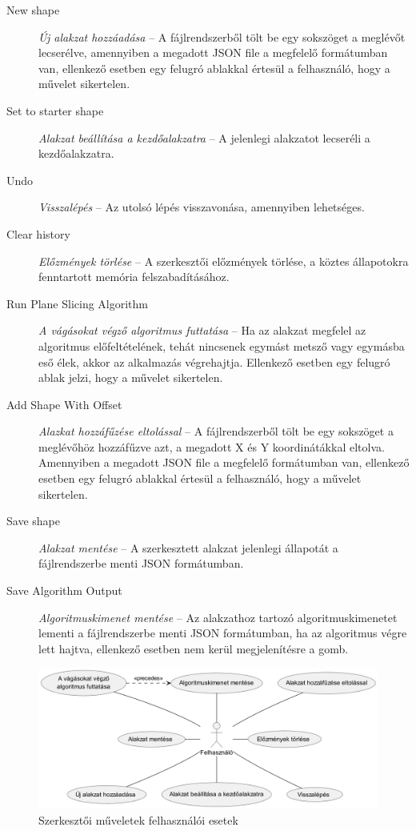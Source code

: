 \begin{description}
    \item[New shape] \textit{Új alakzat hozzáadása} -- A fájlrendszerből tölt be egy sokszöget a meglévőt lecserélve, amennyiben a megadott JSON file a megfelelő formátumban van, ellenkező esetben egy felugró ablakkal értesül a felhasználó, hogy a művelet sikertelen.
    \item[Set to starter shape] \textit{Alakzat beállítása a kezdőalakzatra} -- A jelenlegi alakzatot lecseréli a kezdőalakzatra.
    \item[Undo] \textit{Visszalépés} -- Az utolsó lépés visszavonása, amennyiben lehetséges.
    \item[Clear history] \textit{Előzmények törlése} -- A szerkesztői előzmények törlése, a köztes állapotokra fenntartott memória felszabadításához.
    \item[Run Plane Slicing Algorithm] \textit{A vágásokat végző algoritmus futtatása} -- Ha az alakzat megfelel az algoritmus előfeltételének, tehát nincsenek egymást metsző vagy egymásba eső élek, akkor az alkalmazás végrehajtja. Ellenkező esetben egy felugró ablak jelzi, hogy a művelet sikertelen.
    \item[Add Shape With Offset] \textit{Alazkat hozzáfűzése eltolással} -- A fájlrendszerből tölt be egy sokszöget a meglévőhöz hozzáfűzve azt, a megadott X és Y koordinátákkal eltolva. Amennyiben a megadott JSON file a megfelelő formátumban van, ellenkező esetben egy felugró ablakkal értesül a felhasználó, hogy a művelet sikertelen.
    \item[Save shape] \textit{Alakzat mentése} -- A szerkesztett alakzat jelenlegi állapotát a fájlrendszerbe menti JSON formátumban.
    \item[Save Algorithm Output] \textit{Algoritmuskimenet mentése} -- Az alakzathoz tartozó algoritmuskimenetet lementi a fájlrendszerbe menti JSON formátumban, ha az algoritmus végre lett hajtva, ellenkező esetben nem kerül megjelenítésre a gomb.
\end{description}

\begin{figure}[H]
    \centering
    \includegraphics[width=1\linewidth]{images/usecase_editor_actions.png}
    \caption{Szerkesztői műveletek felhasználói esetek}
    \label{fig:usecase_editor_actions-1}
\end{figure}

